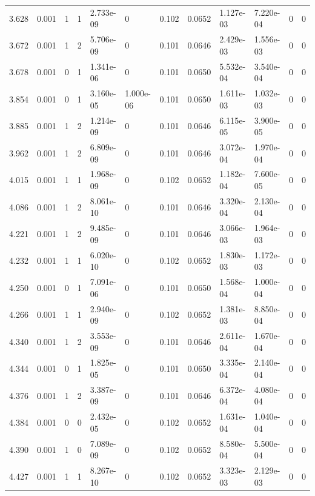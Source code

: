 \documentclass[preview]{standalone}
\begin{document}
{{{\begin{tabular}{L{1.2cm}C{1.2cm} C{0.3cm}C{0.5cm} C{1.4cm}C{1.4cm} C{1.4cm}C{1.4cm} C{1.6cm}C{1.6cm} C{1.6cm}C{1.6cm}}
  3.628  &  0.001  & 1     &  1 &  2.733e-09  & 0  &  0.102&   0.0652& 1.127e-03 & 7.220e-04   &  0 & 0  \\ 
  3.672  &  0.001  & 1     &  2 &  5.706e-09  & 0  &  0.101&   0.0646& 2.429e-03 & 1.556e-03   &  0 & 0  \\ 
  3.678  &  0.001  & 0     &  1 &  1.341e-06  & 0  &  0.101&   0.0650& 5.532e-04 & 3.540e-04   &  0 & 0  \\ 
  3.854  &  0.001  & 0     &  1 &  3.160e-05  & 1.000e-06  &  0.101&   0.0650& 1.611e-03 & 1.032e-03   &  0 & 0  \\ 
  3.885  &  0.001  & 1     &  2 &  1.214e-09  & 0  &  0.101&   0.0646& 6.115e-05 & 3.900e-05   &  0 & 0  \\ 
  3.962  &  0.001  & 1     &  2 &  6.809e-09  & 0  &  0.101&   0.0646& 3.072e-04 & 1.970e-04   &  0 & 0  \\ 
  4.015  &  0.001  & 1     &  1 &  1.968e-09  & 0  &  0.102&   0.0652& 1.182e-04 & 7.600e-05   &  0 & 0  \\ 
  4.086  &  0.001  & 1     &  2 &  8.061e-10  & 0  &  0.101&   0.0646& 3.320e-04 & 2.130e-04   &  0 & 0  \\ 
  4.221  &  0.001  & 1     &  2 &  9.485e-09  & 0  &  0.101&   0.0646& 3.066e-03 & 1.964e-03   &  0 & 0  \\ 
  4.232  &  0.001  & 1     &  1 &  6.020e-10  & 0  &  0.102&   0.0652& 1.830e-03 & 1.172e-03   &  0 & 0  \\ 
  4.250  &  0.001  & 0     &  1 &  7.091e-06  & 0  &  0.101&   0.0650& 1.568e-04 & 1.000e-04   &  0 & 0  \\ 
  4.266  &  0.001  & 1     &  1 &  2.940e-09  & 0  &  0.102&   0.0652& 1.381e-03 & 8.850e-04   &  0 & 0  \\ 
  4.340  &  0.001  & 1     &  2 &  3.553e-09  & 0  &  0.101&   0.0646& 2.611e-04 & 1.670e-04   &  0 & 0  \\ 
  4.344  &  0.001  & 0     &  1 &  1.825e-05  & 0  &  0.101&   0.0650& 3.335e-04 & 2.140e-04   &  0 & 0  \\ 
  4.376  &  0.001  & 1     &  2 &  3.387e-09  & 0  &  0.101&   0.0646& 6.372e-04 & 4.080e-04   &  0 & 0  \\ 
  4.384  &  0.001  & 0     &  0 &  2.432e-05  & 0  &  0.102&   0.0652& 1.631e-04 & 1.040e-04   &  0 & 0  \\ 
  4.390  &  0.001  & 1     &  0 &  7.089e-09  & 0  &  0.102&   0.0652& 8.580e-04 & 5.500e-04   &  0 & 0  \\ 
  4.427  &  0.001  & 1     &  1 &  8.267e-10  & 0  &  0.102&   0.0652& 3.323e-03 & 2.129e-03   &  0 & 0  \\ 

\end{tabular}}}}
\end{document}
